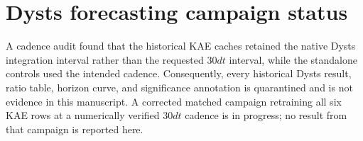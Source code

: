 \section{Dysts forecasting campaign status}
\label{app:dysts_full}

A cadence audit found that the historical KAE caches retained the native Dysts integration interval rather than the requested \(30dt\) interval, while the standalone controls used the intended cadence. Consequently, every historical Dysts result, ratio table, horizon curve, and significance annotation is quarantined and is not evidence in this manuscript. A corrected matched campaign retraining all six KAE rows at a numerically verified \(30dt\) cadence is in progress; no result from that campaign is reported here.
